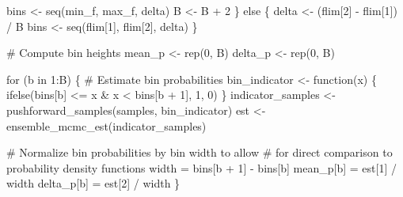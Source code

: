\documentclass[
  letterpaper,
  DIV=11,
  numbers=noendperiod]{scrartcl}
\newenvironment{Shaded}{\begin{snugshade}}{\end{snugshade}}
\newcommand{\CommentTok}[1]{\textcolor[rgb]{0.37,0.37,0.37}{#1}}
\newcommand{\ControlFlowTok}[1]{\textcolor[rgb]{0.00,0.23,0.31}{#1}}
\newcommand{\DecValTok}[1]{\textcolor[rgb]{0.68,0.00,0.00}{#1}}
\newcommand{\FunctionTok}[1]{\textcolor[rgb]{0.28,0.35,0.67}{#1}}
\newcommand{\NormalTok}[1]{\textcolor[rgb]{0.00,0.23,0.31}{#1}}
\newcommand{\OtherTok}[1]{\textcolor[rgb]{0.00,0.23,0.31}{#1}}
\newcommand{\SpecialCharTok}[1]{\textcolor[rgb]{0.37,0.37,0.37}{#1}}
\begin{document}
\begin{Shaded}
\begin{Highlighting}[]
\NormalTok{    bins }\OtherTok{\textless{}{-}} \FunctionTok{seq}\NormalTok{(min\_f, max\_f, delta)}
\NormalTok{    B }\OtherTok{\textless{}{-}}\NormalTok{ B }\SpecialCharTok{+} \DecValTok{2}
\NormalTok{  \} }\ControlFlowTok{else}\NormalTok{ \{}
\NormalTok{    delta }\OtherTok{\textless{}{-}}\NormalTok{ (flim[}\DecValTok{2}\NormalTok{] }\SpecialCharTok{{-}}\NormalTok{ flim[}\DecValTok{1}\NormalTok{]) }\SpecialCharTok{/}\NormalTok{ B}
\NormalTok{    bins }\OtherTok{\textless{}{-}} \FunctionTok{seq}\NormalTok{(flim[}\DecValTok{1}\NormalTok{], flim[}\DecValTok{2}\NormalTok{], delta)}
\NormalTok{  \}}
  
  \CommentTok{\# Compute bin heights}
\NormalTok{  mean\_p }\OtherTok{\textless{}{-}} \FunctionTok{rep}\NormalTok{(}\DecValTok{0}\NormalTok{, B)}
\NormalTok{  delta\_p }\OtherTok{\textless{}{-}} \FunctionTok{rep}\NormalTok{(}\DecValTok{0}\NormalTok{, B)}
  
  \ControlFlowTok{for}\NormalTok{ (b }\ControlFlowTok{in} \DecValTok{1}\SpecialCharTok{:}\NormalTok{B) \{}
    \CommentTok{\# Estimate bin probabilities}
\NormalTok{    bin\_indicator }\OtherTok{\textless{}{-}} \ControlFlowTok{function}\NormalTok{(x) \{}
      \FunctionTok{ifelse}\NormalTok{(bins[b] }\SpecialCharTok{\textless{}=}\NormalTok{ x }\SpecialCharTok{\&}\NormalTok{ x }\SpecialCharTok{\textless{}}\NormalTok{ bins[b }\SpecialCharTok{+} \DecValTok{1}\NormalTok{], }\DecValTok{1}\NormalTok{, }\DecValTok{0}\NormalTok{)}
\NormalTok{    \}}
\NormalTok{    indicator\_samples }\OtherTok{\textless{}{-}} \FunctionTok{pushforward\_samples}\NormalTok{(samples, bin\_indicator)}
\NormalTok{    est }\OtherTok{\textless{}{-}} \FunctionTok{ensemble\_mcmc\_est}\NormalTok{(indicator\_samples)}
    
    \CommentTok{\# Normalize bin probabilities by bin width to allow}
    \CommentTok{\# for direct comparison to probability density functions}
\NormalTok{    width }\OtherTok{=}\NormalTok{ bins[b }\SpecialCharTok{+} \DecValTok{1}\NormalTok{] }\SpecialCharTok{{-}}\NormalTok{ bins[b]}
\NormalTok{    mean\_p[b] }\OtherTok{=}\NormalTok{ est[}\DecValTok{1}\NormalTok{] }\SpecialCharTok{/}\NormalTok{ width}
\NormalTok{    delta\_p[b] }\OtherTok{=}\NormalTok{ est[}\DecValTok{2}\NormalTok{] }\SpecialCharTok{/}\NormalTok{ width}
\NormalTok{  \}}
  

\end{Highlighting}
\end{Shaded}
\end{document}
